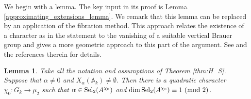 \documentclass[10pt]{amsart}
\numberwithin{equation}{section}
\newtheorem{lemma}[equation]{Lemma}
\theoremstyle{remark}
\theoremstyle{definition}
\theoremstyle{definition}
\theoremstyle{definition}
\theoremstyle{definition}
\theoremstyle{definition}
\theoremstyle{definition}
\theoremstyle{definition}
\theoremstyle{definition}
\begin{document}
 We begin with a lemma. The key input in its proof is Lemma \ref{approximating_extensions_lemma}. We remark that this lemma can be replaced by an application of the fibration method. This approach relates the existence of  a character as in the statement to the vanishing of a suitable vertical Brauer group and gives a more geometric approach to this part of the argument. See \cite[Proposition 6.2]{HS16} and the references therein for details. %
 
 \begin{lemma} \label{existence_of_nice_character}
Take all the notation and assumptions of Theorem \ref{thm:H_S}. Suppose that $\alpha \neq 0$ and   $X_\alpha(\mathbb{A}_k)\neq \emptyset$. Then there is a quadratic character $\chi_0:G_k\to \mu_2$ such that $\alpha \in \textup{Sel}_2(A^{\chi_0})$ and $\dim \textup{Sel}_2(A^{\chi_0})\equiv 1 ~(\textup{mod }2)$. 
 \end{lemma}
 
\end{document}
